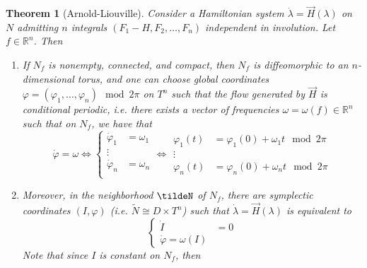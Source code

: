 \documentclass{article}
\newcommand{\R}{\mathbb R}
\newcommand{\vhi}{\varphi}
\newcommand{\w}{\omega}
\newtheorem{thm}{Theorem}
\begin{document}
\begin{thm}[Arnold-Liouville]
    Consider a Hamiltonian system $\dot\lambda = \vec H(\lambda)$ on $N$ admitting $n$ integrals $(F_1 - H, F_2,\dots,F_n)$ independent in involution. Let $f\in \R^n$. Then
    \begin{enumerate}
        \item If $N_f$ is nonempty, connected, and compact, then $N_f$ is diffeomorphic to an $n$-dimensional torus, and one can choose global coordinates $\vhi = (\vhi_1,\dots,\vhi_n) \mod 2\pi$ on $T^n$ such that the flow generated by $\vec H$ is conditional periodic, i.e. there exists a vector of frequencies $\w = \w(f)\in \R^n$ such that on $N_f$, we have that
        \[\dot\vhi=\w\Leftrightarrow\left\{\begin{aligned}
            \dot\vhi_1&=\w_1\\
            \vdots\\
            \dot\vhi_n&=\w_n\\
        \end{aligned}\right.\Leftrightarrow\begin{aligned}
            \vhi_1(t) & = \vhi_1(0) +\w_1 t \mod 2\pi\\
            \vdots\\
            \vhi_n(t) & = \vhi_n(0) +\w_n t \mod 2\pi
        \end{aligned}\]
        \item Moreover, in the neighborhood $\tildeN$ of $N_f$, there are symplectic coordinates $(I,\vhi)$ (i.e. $\tilde N\cong D\times T^n$) such that $\dot\lambda = \vec H(\lambda)$ is equivalent to
        \[\left\{\begin{aligned}
            \dot I&=0\\
            \dot \vhi = \w(I)
        \end{aligned}\right.\]
        Note that since $I$ is constant on $N_f$, then 
    \end{enumerate}
\end{thm}
\end{document}
